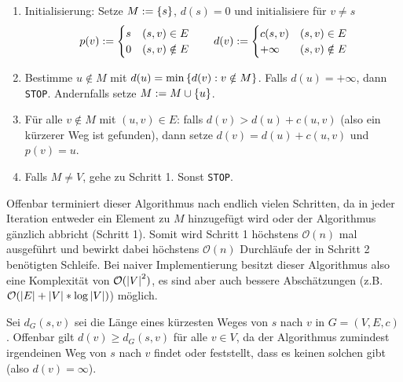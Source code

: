 \begin{enumerate}[label=Schritt \arabic*:, leftmargin=*, start=0]
	\item Initialisierung: Setze $M \mathrel{:=} \left\{ s \right\}$, $d(s) = 0$ und initialisiere für $v \neq s$
	\begin{equation*}
		p(v) \mathrel{:=} \begin{cases}
		s & (s,v) \in E \\ 0 & (s,v) \notin E
		\end{cases}
		\qquad
		d(v) \mathrel{:=} \begin{cases}
		c(s,v) & (s,v) \in E \\ +\infty &(s,v) \notin E
		\end{cases}
	\end{equation*}
	\item Bestimme $u \notin M$ mit $d(u) = \min\left\{ d(v) : v \notin M \right\}$. Falls $d(u) = +\infty$, dann \texttt{STOP}. Andernfalls setze $M \mathrel{:=} M \cup \left\{ u \right\}$.
	\item Für alle $v \notin M$ mit $(u,v) \in E$: falls $d(v) > d(u) + c(u,v)$ (also ein kürzerer Weg ist gefunden), dann setze $d(v) = d(u) + c(u,v)$ und $p(v) = u$.
	\item Falls $M \neq V$, gehe zu Schritt 1. Sonst \texttt{STOP}.
\end{enumerate}

Offenbar terminiert dieser Algorithmus nach endlich vielen Schritten, da in jeder Iteration entweder ein Element zu $M$ hinzugefügt wird oder der Algorithmus gänzlich abbricht (Schritt 1). Somit wird Schritt 1 höchstens $\mathcal{O}(n)$ mal ausgeführt und bewirkt dabei höchstens $\mathcal{O}(n)$ Durchläufe der in Schritt 2 benötigten Schleife. Bei naiver Implementierung besitzt dieser Algorithmus also eine Komplexität von $\mathcal{O}(\left| V \right|^2)$, es sind aber auch bessere Abschätzungen (z.B. $\mathcal{O}(\left| E \right| + \left| V \right| * \log\left| V \right|)$) möglich.

Sei $d_G(s,v)$ sei die Länge eines kürzesten Weges von $s$ nach $v$ in $G= (V,E,c)$. Offenbar gilt $d(v) \ge d_G(s,v)$ für alle $v \in V$, da der Algorithmus zumindest irgendeinen Weg von $s$ nach $v$ findet oder feststellt, dass es keinen solchen gibt (also $d(v) = \infty$).


